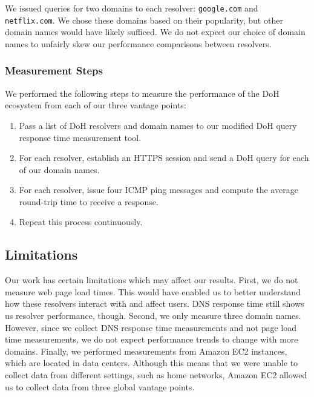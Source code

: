 We issued queries for two domains to each resolver: \texttt{google.com} and \texttt{netflix.com}.
We chose these domains based on their popularity, but other domain names would have likely sufficed.
We do not expect our choice of domain names to unfairly skew our performance comparisons between resolvers.

\subsubsection{Measurement Steps}
We performed the following steps to measure the performance of the DoH ecosystem from each of our three vantage points:
\begin{enumerate}
    \item Pass a list of DoH resolvers and domain names to our modified DoH query response time measurement tool.
    \item For each resolver, establish an HTTPS session and send a DoH query for each of our domain names.
    \item For each resolver, issue four ICMP ping messages and compute the average round-trip time to receive a response.
    \item Repeat this process continuously.
\end{enumerate}

\subsection{Limitations}
Our work has certain limitations which may affect our results. 
First, we do not measure web page load times. 
This would have enabled us to better understand how these resolvers interact with and affect users. 
DNS response time still shows us resolver performance, though. 
Second, we only measure three domain names. 
However, since we collect DNS response time measurements and not page load time measurements, we do not expect performance trends to change with more domains.
Finally, we performed measurements from Amazon EC2 instances, which are located in data centers. 
Although this means that we were unable to collect data from different settings, such as home networks, Amazon EC2 allowed us to collect data from three global vantage points. 
